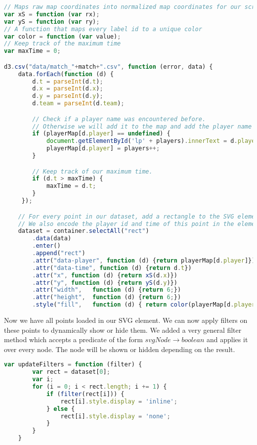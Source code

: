 \begin{lstlisting}[language=JavaScript]
// Maps raw map coordinates into normalized map coordinates for our screen
var xS = function (var rx);
var yS = function (var ry);
// A function that maps every label id to a unique color
var color = function (var value);
// Keep track of the maximum time
var maxTime = 0;

d3.csv("data/match_"+match+".csv", function (error, data) {
    data.forEach(function (d) {
        d.t = parseInt(d.t);
        d.x = parseInt(d.x);
        d.y = parseInt(d.y);
        d.team = parseInt(d.team);

        // Check if a player name was encountered before. 
        // Otherwise we will add it to the map and add the player name to the label.
        if (playerMap[d.player] == undefined) {
            document.getElementById('lp' + players).innerText = d.player;
            playerMap[d.player] = players++;
        }

        // Keep track of our maximum time.
        if (d.t > maxTime) {
            maxTime = d.t;
        }
     });

    // For every point in our dataset, add a rectangle to the SVG element.
    // We also encode the player id and time of this point in the element.
    dataset = container.selectAll("rect")
        .data(data)
        .enter()
        .append("rect")
        .attr("data-player", function (d) {return playerMap[d.player]})
        .attr("data-time", function (d) {return d.t})
        .attr("x", function (d) {return xS(d.x)})
        .attr("y", function (d) {return yS(d.y)})
        .attr("width",   function (d) {return 6;})
        .attr("height",  function (d) {return 6;})
        .style("fill",   function (d) { return color(playerMap[d.player]) });
\end{lstlisting}

Now we have all points loaded in our SVG element. We can now apply filters on these points to dynamically show or hide them. We added a very general filter method which accepts a predicate of the form $svgNode \rightarrow boolean$ and applies it over every node. The node will be shown or hidden depending on the result.

\begin{lstlisting}[language=JavaScript]
var updateFilters = function (filter) {
        var rect = dataset[0];
        var i;
        for (i = 0; i < rect.length; i += 1) {
            if (filter(rect[i])) {
                rect[i].style.display = 'inline';
            } else {
                rect[i].style.display = 'none';
            }
        }
    }
\end{lstlisting}

